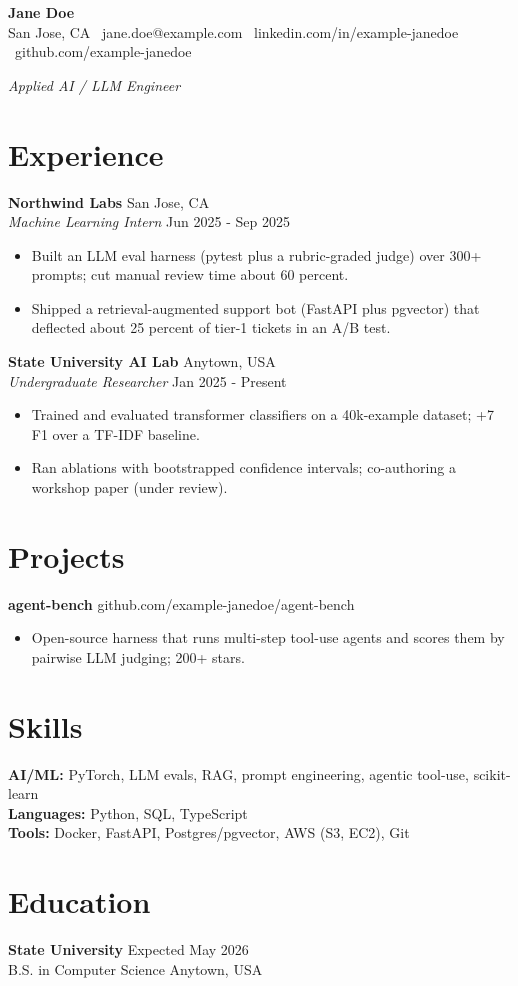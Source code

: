 \documentclass[10pt]{article}
\begin{document}
\begin{center}
  {\LARGE \textbf{Jane Doe}} \\[3pt]
  San Jose, CA \textbullet\ jane.doe@example.com \textbullet\ linkedin.com/in/example-janedoe \textbullet\ github.com/example-janedoe
\end{center}

{\centering \textit{Applied AI / LLM Engineer}\par}

\section*{Experience}
\textbf{Northwind Labs} \hfill San Jose, CA\\
\textit{Machine Learning Intern} \hfill Jun 2025 - Sep 2025
\begin{itemize}
  \item Built an LLM eval harness (pytest plus a rubric-graded judge) over 300+ prompts; cut manual review time about 60 percent.
  \item Shipped a retrieval-augmented support bot (FastAPI plus pgvector) that deflected about 25 percent of tier-1 tickets in an A/B test.
\end{itemize}

\textbf{State University AI Lab} \hfill Anytown, USA\\
\textit{Undergraduate Researcher} \hfill Jan 2025 - Present
\begin{itemize}
  \item Trained and evaluated transformer classifiers on a 40k-example dataset; +7 F1 over a TF-IDF baseline.
  \item Ran ablations with bootstrapped confidence intervals; co-authoring a workshop paper (under review).
\end{itemize}

\section*{Projects}
\textbf{agent-bench} \hfill github.com/example-janedoe/agent-bench
\begin{itemize}
  \item Open-source harness that runs multi-step tool-use agents and scores them by pairwise LLM judging; 200+ stars.
\end{itemize}

\section*{Skills}
\textbf{AI/ML:} PyTorch, LLM evals, RAG, prompt engineering, agentic tool-use, scikit-learn\\
\textbf{Languages:} Python, SQL, TypeScript\\
\textbf{Tools:} Docker, FastAPI, Postgres/pgvector, AWS (S3, EC2), Git

\section*{Education}
\textbf{State University} \hfill Expected May 2026\\
B.S. in Computer Science \hfill Anytown, USA
\end{document}
